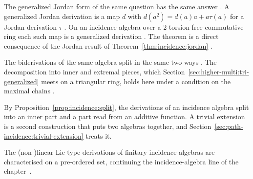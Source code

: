 The generalized Jordan form of the same question has the same answer
\cite[p.~6]{FerreiraPierinFerreira2018}. A generalized Jordan derivation is a
map $d$ with $d(a^{2})=d(a)a+a\tau(a)$ for a Jordan derivation $\tau$
\cite[p.~1]{FerreiraPierinFerreira2018}. On an incidence algebra over a
2-torsion free commutative ring each such map is a generalized derivation
\cite[Theorem~2.1, p.~6]{FerreiraPierinFerreira2018}. The theorem is a direct
consequence of the Jordan result of
Theorem~\ref{thm:incidence:jordan} \cite[p.~1]{FerreiraPierinFerreira2018}.

The biderivations of the same algebra split in the same two ways
\cite[p.~13]{GuanZhang2024}. The decomposition into inner and extremal pieces,
which Section~\ref{sec:higher-multi:tri-generalized} meets on a triangular
ring, holds here under a condition on the maximal chains
\cite[Theorem~4.10, p.~13]{GuanZhang2024}.

By Proposition~\ref{prop:incidence:split}, the derivations of an incidence
algebra split into an inner part and a part read from an additive function. A
trivial extension is a second construction that puts two algebras together,
and Section~\ref{sec:path-incidence:trivial-extension} treats it.

The (non-)linear Lie-type derivations of finitary incidence algebras are
characterised on a pre-ordered set, continuing the incidence-algebra line of
the chapter~\cite{WlNonlinearLieTypeDerivationsOfF2020}.
